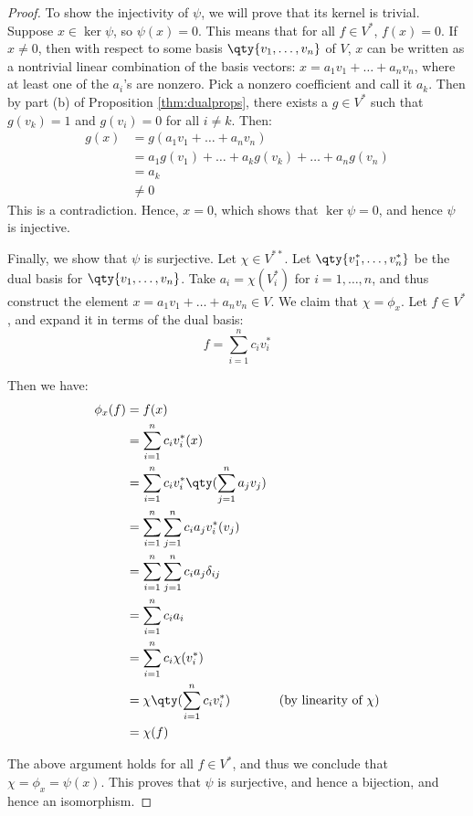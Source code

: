 \begin{proof}
  To show the injectivity of \( \psi \), we will prove that its kernel is trivial. Suppose \( x\in\ker\psi \), so \( \psi(x)=0 \). This means that for all \( f\in V^* \), \( f(x)=0 \). If \( x\neq 0 \), then with respect to some basis \( \qty{v_1,\dots,v_n} \) of \( V \), \( x \) can be written as a nontrivial linear combination of the basis vectors: \( x=a_1v_1+\dots+a_nv_n \), where at least one of the \( a_i \)'s are nonzero. Pick a nonzero coefficient and call it \( a_k \). Then by part (b) of Proposition \ref{thm:dualprops}, there exists a \( g\in V^* \) such that \( g(v_k)=1 \) and \( g(v_i)=0 \) for all \( i\neq k \). Then:
  \begin{align*}
    g(x)&=g(a_1v_1+\dots+a_nv_n)\\
        &= a_1g(v_1)+\dots+a_kg(v_k)+\dots+a_ng(v_n)\\
        &= a_k\\
        &\neq 0
  \end{align*}
  This is a contradiction. Hence, \( x=0 \), which shows that \( \ker\psi=\qty{0} \), and hence \( \psi \) is injective.

  \vspace{3mm}

  Finally, we show that \( \psi \) is surjective. Let \( \chi\in V^{**} \). Let \( \qty{v^*_1,\dots,v^*_n} \) be the dual basis for \( \qty{v_1,\dots,v_n} \). Take \( a_i=\chi(V^*_i) \) for \( i=1,\dots,n \), and thus construct the element \( x=a_1v_1+\dots+a_nv_n\in V \). We claim that \( \chi=\phi_x \). Let \( f\in V^* \), and expand it in terms of the dual basis:
  \[ f=\sum_{i=1}^nc_iv^*_i \]

  Then we have:
  \begin{align*}
    \phi_x(f)&= f(x)\\
    &= \sum_{i=1}^nc_iv^*_i(x)\\
    &= \sum_{i=1}^nc_iv^*_i\qty(\sum_{j=1}^na_jv_j)\\
    &= \sum_{i=1}^n\sum_{j=1}^nc_ia_jv^*_i(v_j)\\
    &= \sum_{i=1}^n\sum_{j=1}^nc_ia_j\delta_{ij}\\
    &= \sum_{i=1}^nc_ia_i\\
    &= \sum_{i=1}^n c_i\chi(v^*_i)\\
    &= \chi\qty(\sum_{i=1}^nc_iv^*_i) &(\text{by linearity of }\chi)\\
    &= \chi(f)
  \end{align*}

  The above argument holds for all \( f\in V^* \), and thus we conclude that \( \chi=\phi_x=\psi(x) \). This proves that \( \psi \) is surjective, and hence a bijection, and hence an isomorphism.
\end{proof}

